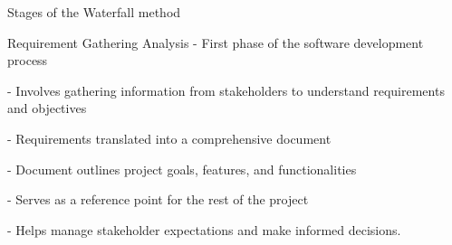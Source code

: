 \begin{frame}{Stages of the Waterfall method}
    \begin{block}{Requirement Gathering Analysis}
        - First phase of the software development process
        
        - Involves gathering information from stakeholders to understand requirements and objectives
        
        - Requirements translated into a comprehensive document

        - Document outlines project goals, features, and functionalities

        - Serves as a reference point for the rest of the project

        - Helps manage stakeholder expectations and make informed decisions.
    \end{block}   
\end{frame}